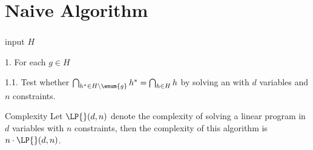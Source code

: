 \section{Naive Algorithm}
\begin{frame}\frametitle{\insertsection}\justifying
\begin{algo}[(Naive)]
\item[input] \(H\)
\item[1.] For each \(g \in H\)
\item[1.1.] Test whether \(\bigcap_{h^* \in H \setminus \enum{g}} h^* = \bigcap_{h \in H}
h\) by solving an \LP{} with \(d\) variables and \(n\) constraints.
\end{algo}
\pause
\begin{ebox}{Complexity}
	Let \(\LP{}(d,n)\) denote the complexity of solving a linear program in
	\(d\) variables with \(n\) constraints, then the complexity of this
	algorithm is \(n\cdot\LP{}(d,n)\).
\end{ebox}
\end{frame}
